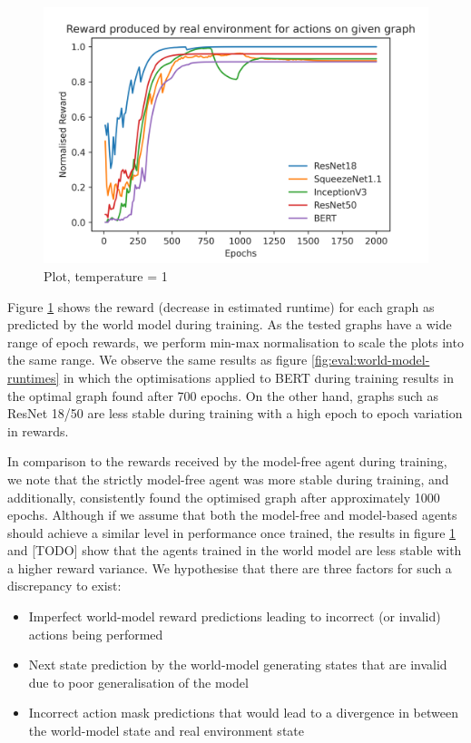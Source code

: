 \begin{figure}[ht]
  \centering
  \includegraphics[width=1\columnwidth]{sections/5evaluation/images/mb_ctrl_training_reward.png}
  \caption[Predicted epoch reward during training of agent in world model]{Plot, temperature = 1}
  \label{fig:eval:world-model-pred-reward}
\end{figure}

Figure \ref{fig:eval:world-model-pred-reward} shows the reward (decrease in estimated runtime) for each graph as predicted by the world model during training. As the tested graphs have a wide range of epoch rewards, we perform min-max normalisation to scale the plots into the same range. We observe the same results as figure \ref{fig:eval:world-model-runtimes} in which the optimisations applied to BERT during training results in the optimal graph found after 700 epochs. On the other hand, graphs such as ResNet 18/50 are less stable during training with a high epoch to epoch variation in rewards.

In comparison to the rewards received by the model-free agent during training, we note that the strictly model-free agent was more stable during training, and additionally, consistently found the optimised graph after approximately 1000 epochs. Although if we assume that both the model-free and model-based agents should achieve a similar level in performance once trained, the results in figure \ref{fig:eval:world-model-pred-reward} and [TODO] show that the agents trained in the world model are less stable with a higher reward variance. We hypothesise that there are three factors for such a discrepancy to exist:

\begin{itemize}
  \item Imperfect world-model reward predictions leading to incorrect (or invalid) actions being performed
  \item Next state prediction by the world-model generating states that are invalid due to poor generalisation of the model
  \item Incorrect action mask predictions that would lead to a divergence in between the world-model state and real environment state 
\end{itemize}

